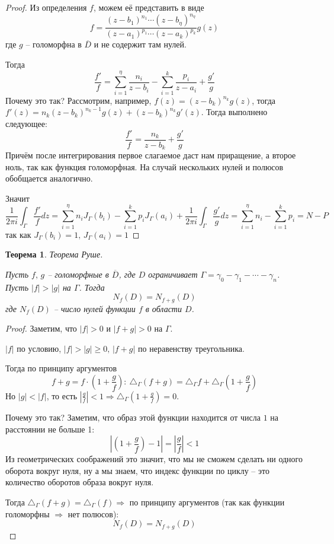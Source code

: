 \documentclass[a4paper,12pt]{article}
\renewcommand{\geq}{\ensuremath{\geqslant}}
\theoremstyle{plain}
\newtheorem{theorem}{Теорема}[section]
\theoremstyle{definition}
\theoremstyle{remark}
\begin{document}
\begin{proof}
	Из определения $f$, можем её представить в виде
	\[
		f = \frac{(z - b_1)^{n_1}\cdots(z - b_\eta)^{n_\eta}}{(z - a_1)^{p_1}\cdots(z - a_k)^{p_k}}g(z)
	\]
	где $g$ -- голоморфна в $\overline{D}$ и не содержит там нулей.

	Тогда
	\[
		\frac{f'}{f} = \sum_{i = 1}^\eta\frac{n_i}{z - b_i} - \sum_{i = 1}^k\frac{p_i}{z - a_i} + \frac{g'}{g}
	\]
	Почему это так? Рассмотрим, например, $f(z) = (z - b_k)^{n_k}g(z)$, тогда $f'(z) = n_k(z - b_k)^{n_k - 1}g(z) + (z - b_k)^{n_k}g'(z)$. Тогда выполнено следующее:
	\[
		\frac{f'}{f} = \frac{n_k}{z - b_k} + \frac{g'}{g}
	\]
	Причём после интегрирования первое слагаемое даст нам приращение, а второе ноль, так как функция голоморфная. На случай нескольких нулей и полюсов обобщается аналогично.

	Значит
	\[
		\frac{1}{2\pi i} \int_\Gamma\frac{f'}{f}dz = \sum_{i = 1}^\eta n_iJ_\Gamma(b_i) - \sum_{i = 1}^k p_iJ_\Gamma(a_i) + \frac{1}{2\pi i}\int_\Gamma\frac{g'}{g}dz = \sum_{i = 1}^\eta n_i - \sum_{i = 1}^k p_i = N - P
	\]
	так как $J_\Gamma(b_i) = 1,\, J_\Gamma(a_i) = 1$
\end{proof}

\begin{theorem}
	Теорема Руше.

	Пусть $f,\, g$ -- голоморфные в $\overline{D}$, где $D$ ограничивает $\Gamma = \gamma_0 - \gamma_1 - \cdots - \gamma_n$. Пусть $\vert f\vert > \vert g\vert$ на $\Gamma$. Тогда
	\[
		N_f(D) = N_{f + g}(D)
	\]
	где $N_f(D)$ -- число нулей функции $f$ в области $D$.
\end{theorem}

\begin{proof}
	Заметим, что $\vert f\vert > 0$ и $\vert f + g\vert > 0$ на $\Gamma$.

	$\vert f\vert$ по условию, $\vert f\vert > \vert g\vert \geq 0,\, \vert f + g\vert$ по неравенству треугольника.

	Тогда по принципу аргументов
	\[
		f + g = f\cdot\left(1 + \frac{g}{f}\right) :\: \triangle_\Gamma(f + g) = \triangle_\Gamma f + \triangle_\Gamma\left(1 + \frac{g}{f}\right)
	\]
	Но $\vert g\vert < \vert f\vert$, то есть $\left\vert\frac{g}{f}\right\vert < 1 \Rightarrow \triangle_\Gamma\left(1 + \frac{g}{f}\right) = 0$.

	Почему это так? Заметим, что образ этой функции находится от числа $1$ на расстоянии не больше 1:
	\[
		\left\vert\left(1 + \frac{g}{f}\right) - 1\right\vert = \left\vert\frac{g}{f}\right\vert < 1
	\]
	Из геометрических соображений это значит, что мы не сможем сделать ни одного оборота вокруг нуля, ну а мы знаем, что индекс функции по циклу -- это количество оборотов образа вокруг нуля.

	Тогда $\triangle_\Gamma(f + g) = \triangle_\Gamma(f) \Rightarrow$ по принципу аргументов (так как функции голоморфны $\Rightarrow$ нет полюсов):
	\[
		N_f(D) = N_{f +g}(D)
	\]
\end{proof}
\end{document}
